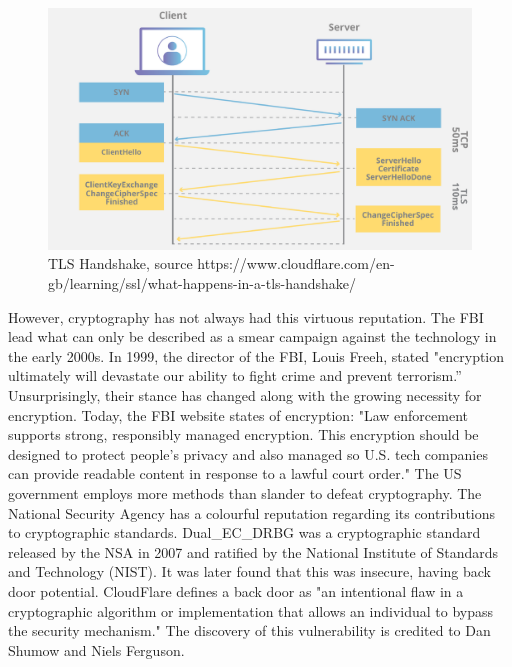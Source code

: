 \begin{figure}
  \centering
  \includegraphics[width=\textwidth]{Circumvention Tools/TLS_Handshake.png}
  \caption{TLS Handshake, source https://www.cloudflare.com/en-gb/learning/ssl/what-happens-in-a-tls-handshake/}
  \label{fig:your_label_here}
\end{figure}

However, cryptography has not always had this virtuous reputation. The FBI lead what can only be described as a smear campaign against the technology in the early 2000s. In 1999, the director of the FBI, Louis Freeh, stated "encryption ultimately will devastate our ability to fight crime and prevent terrorism.” \cite{bitsbook_chapter5} Unsurprisingly, their stance has changed along with the growing necessity for encryption. Today, the FBI website states of encryption: "Law enforcement supports strong, responsibly managed encryption. This encryption should be designed to protect people’s privacy and also managed so U.S. tech companies can provide readable content in response to a lawful court order." \cite{fbi_lawful_access} The US government employs more methods than slander to defeat cryptography. The National Security Agency \cite{nsa_website} has a colourful reputation regarding its contributions to cryptographic standards. Dual\_EC\_DRBG was a cryptographic standard released by the NSA in 2007 and ratified by the National Institute of Standards and Technology (NIST). It was later found that this was insecure, having back door potential. CloudFlare defines a back door as "an intentional flaw in a cryptographic algorithm or implementation that allows an individual to bypass the security mechanism." \cite{cloudflare_nsa_backdoor} The discovery of this vulnerability is credited to Dan Shumow and Niels Ferguson. \cite{schneier_nsa_backdoor}

